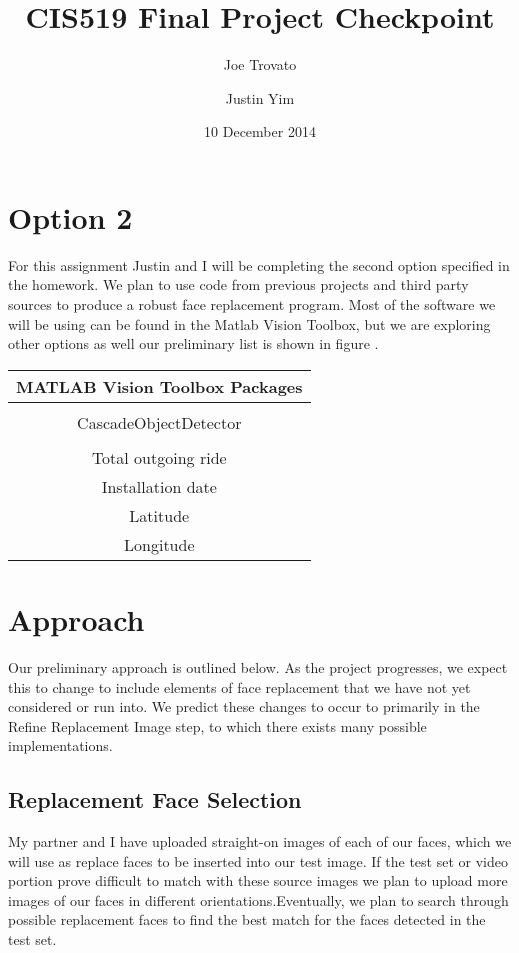 \documentclass{article}
\begin{document}
\title{CIS519 Final Project Checkpoint}
\author{Joe Trovato \and Justin Yim}
\date{10 December 2014}
\maketitle

\section{Option 2}
For this assignment Justin and I will be completing the second option specified in the homework. We plan to use code from previous projects and third party sources to produce a robust face replacement program. Most of the software we will be using can be found in the Matlab Vision Toolbox, but we are exploring other options as well our preliminary list is shown in figure .

	\begin{center}
		\begin{tabular}{|c|}
			\hline
			MATLAB Vision Toolbox Packages \\
			\hline
			\\
			CascadeObjectDetector\\
			\\
			Total outgoing ride\\
			Installation date\\
			Latitude\\
			Longitude\\
			\hline
		\end{tabular}
	\end{center}


\section{Approach}
Our preliminary approach is outlined below. As the project progresses, we expect this to change to include elements of face replacement that we have not yet considered or run into. We predict these changes to occur to primarily in the Refine Replacement Image step, to which there exists many possible implementations.

\subsection{Replacement Face Selection}
My partner and I have uploaded straight-on images of each of our faces, which we will use as replace faces to be inserted into our test image. If the test set or video portion prove difficult to match with these source images we plan to upload more images of our faces in different orientations.Eventually, we plan to search through possible replacement faces to find the best match for the faces detected in the test set.
\end{document}
